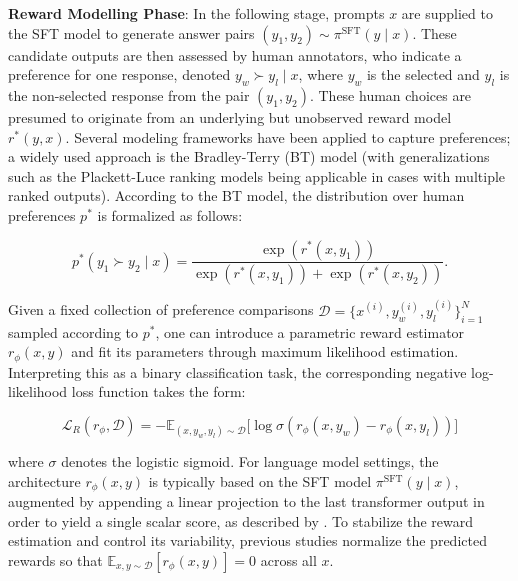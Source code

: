 \textbf{Reward Modelling Phase}: In the following stage, prompts $x$ are supplied to the SFT model to generate answer pairs $(y_1, y_2) \sim \pi^\text{SFT}(y \mid x)$. These candidate outputs are then assessed by human annotators, who indicate a preference for one response, denoted $y_w\succ y_l \mid x$, where $y_w$ is the selected and $y_l$ is the non-selected response from the pair $(y_1, y_2)$. These human choices are presumed to originate from an underlying but unobserved reward model $r^*(y, x)$. Several modeling frameworks have been applied to capture preferences; a widely used approach is the Bradley-Terry (BT) model \cite{bradley1952rankanalysis} (with generalizations such as the Plackett-Luce ranking models \citep{plackett1975analysis, luce2012individual} being applicable in cases with multiple ranked outputs). According to the BT model, the distribution over human preferences $p^*$ is formalized as follows:

\begin{equation}\label{eq:bradley-terry}
    p^*(y_1\succ y_2 \mid x)=\frac{\exp\left(r^*(x, y_1)\right)}{\exp\left(r^*(x, y_1)\right) + \exp\left(r^*(x, y_2)\right)}.
\end{equation}

Given a fixed collection of preference comparisons $\mathcal{D}=\bigl\{x^{(i)}, y_w^{(i)}, y_l^{(i)}\bigr\}_{i=1}^N$ sampled according to $p^*$, one can introduce a parametric reward estimator $r_{\phi}(x, y)$ and fit its parameters through maximum likelihood estimation. Interpreting this as a binary classification task, the corresponding negative log-likelihood loss function takes the form:

\begin{equation}\label{eq:reward_model}
    \mathcal{L}_R(r_{\phi}, \mathcal{D}) = -\mathbb{E}_{(x, y_w, y_l)\sim \mathcal{D}}\bigl[\log \sigma(r_{\phi}(x, y_w)- r_{\phi}(x, y_l))\bigr]
\end{equation}

where $\sigma$ denotes the logistic sigmoid. For language model settings, the architecture $r_{\phi}(x, y)$ is typically based on the SFT model $\pi^\text{SFT}(y \mid x)$, augmented by appending a linear projection to the last transformer output in order to yield a single scalar score, as described by \cite{ziegler2020finetuning}. To stabilize the reward estimation and control its variability, previous studies normalize the predicted rewards so that $\mathbb{E}_{x,y\sim \mathcal{D}}\left[r_\phi(x, y)\right] = 0$ across all $x$.

